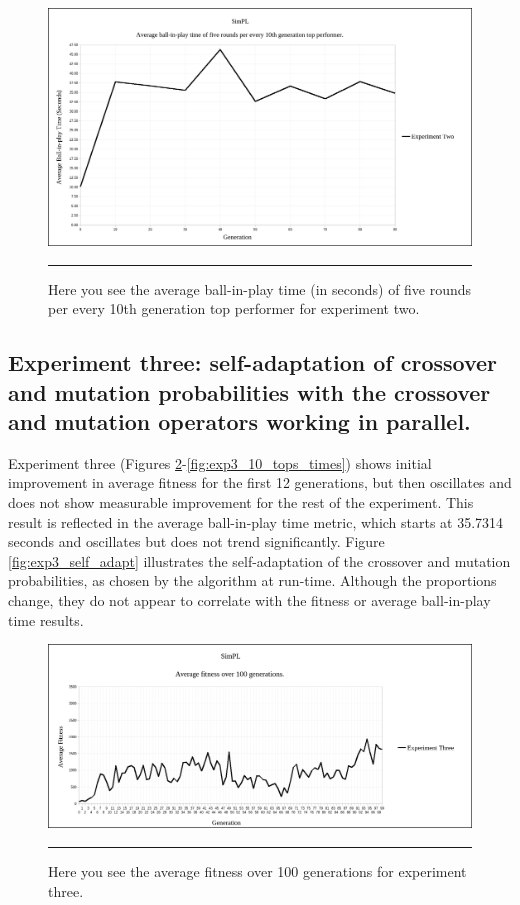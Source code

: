 \begin{figure}[htbp]  
  \centering
  \includegraphics[width=5in]{../Figures/Chapter3/exp2_10_tops_times.png}
  \rule{35em}{0.5pt}
  \caption[Experiment Two Top Performers Tournament]{Here you see the average ball-in-play time (in seconds) of five rounds per every 10th generation top performer for experiment two.}
  \label{fig:exp2_10_tops_times}
\end{figure}

\subsection[Experiment Three]{Experiment three: self-adaptation of crossover and mutation probabilities with the crossover and mutation operators working in parallel.}

Experiment three (Figures \ref{fig:exp3_avg_fit}-\ref{fig:exp3_10_tops_times}) shows initial improvement in average fitness for the first 12 generations, but then oscillates and does not show measurable improvement for the rest of the experiment. This result is reflected in the average ball-in-play time metric, which starts at 35.7314 seconds and oscillates but does not trend significantly. Figure \ref{fig:exp3_self_adapt} illustrates the self-adaptation of the crossover and mutation probabilities, as chosen by the algorithm at run-time. Although the proportions change, they do not appear to correlate with the fitness or average ball-in-play time results.

\begin{figure}[htbp]  
  \centering
  \includegraphics[width=5in]{../Figures/Chapter3/exp3_avg_fit.png}
  \rule{35em}{0.5pt}
  \caption[Experiment Three Average Fitness]{Here you see the average fitness over 100 generations for experiment three.}
  \label{fig:exp3_avg_fit}
\end{figure}

